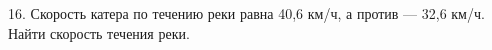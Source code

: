 16. Скорость катера по течению реки равна 40,6 км/ч, а против --- 32,6 км/ч. Найти скорость течения реки.\\
